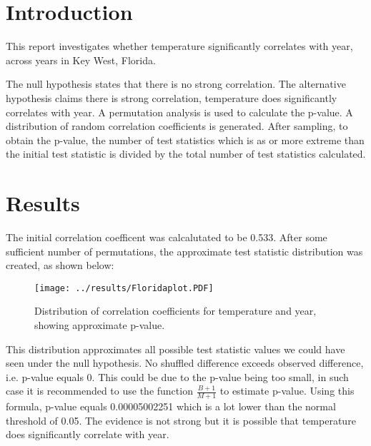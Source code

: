 \documentclass[11pt]{article}
\title{\vspace{-1.5cm}{Is Florida getting warmer?}}
\author{An Nguyen}
\date{\today}
\begin{document}
\maketitle

\section{Introduction}
This report investigates whether temperature significantly correlates with year, across years in Key West, Florida. 

The null hypothesis states that there is no strong correlation. The alternative hypothesis claims there is strong correlation, temperature does significantly correlates with year. A permutation analysis is used to calculate the p-value. A distribution of random correlation coefficients is generated. After sampling, to obtain the p-value, the number of test statistics which is as or more extreme than the initial test statistic is divided by the total number of test statistics calculated.

\section{Results}
The initial correlation coefficent was calcalutated to be 0.533. After some sufficient number of permutations, the approximate test statistic distribution was created, as shown below: 

\begin{figure}[H]
\texttt{[image: ../results/Floridaplot.PDF]}
\centering
\caption{Distribution of correlation coefficients for temperature and year, showing approximate p-value.}
\end{figure}

This distribution approximates all possible test statistic values we could have seen under the null hypothesis. No shuffled difference exceeds observed difference, i.e. p-value equals 0. This could be due to the p-value being too small, in such case it is recommended to use the function $\frac{B+1}{M+1}$ to estimate p-value. Using this formula, p-value equals 0.00005002251 which is a lot lower than the normal threshold of 0.05. The evidence is not strong but it is possible that temperature does significantly correlate with year. 
\end{document}
